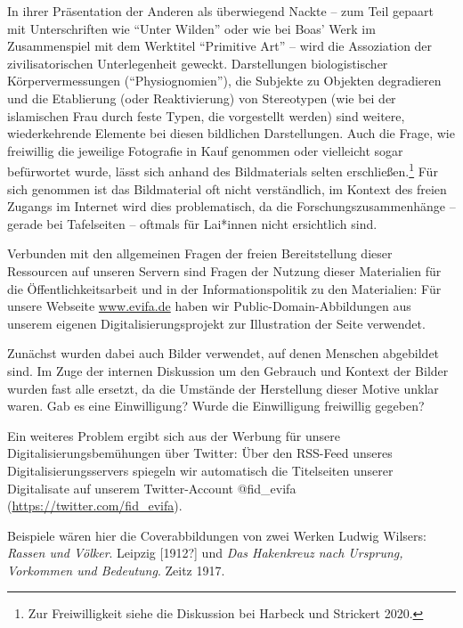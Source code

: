 \documentclass[a4paper,
fontsize=11pt,
oneside,
numbers=noperiodatend,
parskip=half-,
bibliography=totoc,
final
]{scrartcl}
\begin{document}
In ihrer Präsentation der Anderen als überwiegend Nackte -- zum Teil
gepaart mit Unterschriften wie \enquote{Unter Wilden} oder wie bei Boas'
Werk im Zusammenspiel mit dem Werktitel \enquote{Primitive Art} -- wird
die Assoziation der zivilisatorischen Unterlegenheit geweckt.
Darstellungen biologistischer Körpervermessungen
(\enquote{Physiognomien}), die Subjekte zu Objekten degradieren und die
Etablierung (oder Reaktivierung) von Stereotypen (wie bei der
islamischen Frau durch feste Typen, die vorgestellt werden) sind
weitere, wiederkehrende Elemente bei diesen bildlichen Darstellungen.
Auch die Frage, wie freiwillig die jeweilige Fotografie in Kauf genommen
oder vielleicht sogar befürwortet wurde, lässt sich anhand des
Bildmaterials selten erschließen.\footnote{Zur Freiwilligkeit siehe die
  Diskussion bei Harbeck und Strickert 2020.} Für sich genommen ist das
Bildmaterial oft nicht verständlich, im Kontext des freien Zugangs im
Internet wird dies problematisch, da die Forschungszusammenhänge --
gerade bei Tafelseiten -- oftmals für Lai*innen nicht ersichtlich sind.

Verbunden mit den allgemeinen Fragen der freien Bereitstellung dieser
Ressourcen auf unseren Servern sind Fragen der Nutzung dieser
Materialien für die Öffentlichkeitsarbeit und in der Informationspolitik
zu den Materialien: Für unsere Webseite
\href{http://www.evifa.de}{www.evifa.de} haben wir
Public-Domain-Abbildungen aus unserem eigenen Digitalisierungsprojekt
zur Illustration der Seite verwendet.

Zunächst wurden dabei auch Bilder verwendet, auf denen Menschen
abgebildet sind. Im Zuge der internen Diskussion um den Gebrauch und
Kontext der Bilder wurden fast alle ersetzt, da die Umstände der
Herstellung dieser Motive unklar waren. Gab es eine Einwilligung? Wurde
die Einwilligung freiwillig gegeben?

Ein weiteres Problem ergibt sich aus der Werbung für unsere
Digitalisierungsbemühungen über Twitter: Über den RSS-Feed unseres
Digitalisierungsservers spiegeln wir automatisch die Titelseiten unserer
Digitalisate auf unserem Twitter-Account @fid\_evifa
(\url{https://twitter.com/fid_evifa}).

Beispiele wären hier die Coverabbildungen von zwei Werken Ludwig
Wilsers: \emph{Rassen und Völker}. Leipzig {[}1912?{]} und \emph{Das
Hakenkreuz nach Ursprung, Vorkommen und Bedeutung}. Zeitz 1917.
\end{document}
